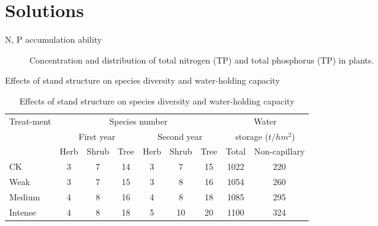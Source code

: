 \section{Solutions}

\begin{frame}{N, P accumulation ability}
\begin{figure}
	\centering
	\begin{columns}[T]
\end{columns}
\caption{Concentration and distribution of total nitrogen (TP) and total phosphorus (TP) in plants. \cite{yu2014biomass}}

\end{figure}
\end{frame}

\begin{frame}{Effects of stand structure on species diversity and water-holding capacity}
\begin{table}
	\caption{Effects of stand structure on species diversity and water-holding capacity}
	\begin{tabular}{@{}l@{}|@{}cccccc@{}|@{}cc@{}}
		\toprule
		\multirow[c]{3}{4ex}{Treat-ment} & \multicolumn{6}{c}{Species number} & \multicolumn{2}{|c}{Water}\\
		&\multicolumn{3}{c}{First year} & \multicolumn{3}{c}{Second year}& \multicolumn{2}{|c}{storage ($t/hm^2$)}\\
		& Herb&Shrub & Tree &Herb&Shrub & Tree&Total& Non-capillary\\
		\midrule
		CK&3&7&14&3&7&15&1022&220\\
		Weak&3&7&15&3&8&16&1054&260\\
		Medium&4&8&16&4&8&18&1085&295\\
		Intense&4&8&18&5&10&20&1100&324\\
		\bottomrule
	\end{tabular}
\end{table}
\end{frame}